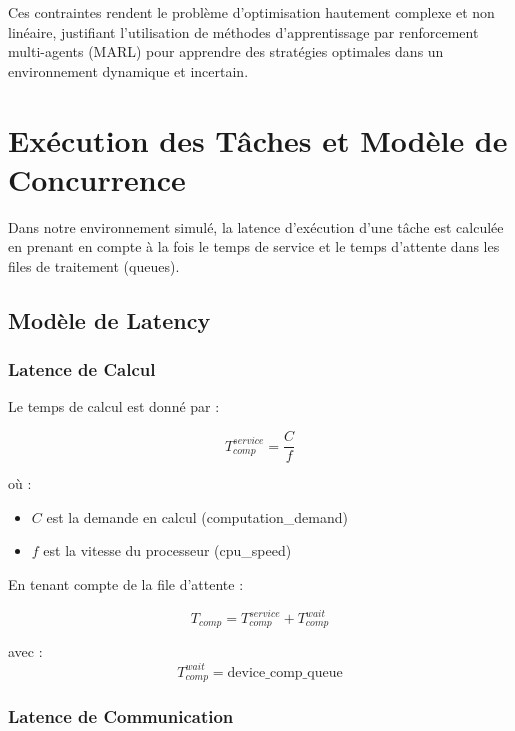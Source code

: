 \documentclass[12pt,a4paper]{article}
\begin{document}
Ces contraintes rendent le problème d'optimisation hautement complexe et non linéaire, justifiant l'utilisation de méthodes d'apprentissage par renforcement multi-agents (MARL) pour apprendre des stratégies optimales dans un environnement dynamique et incertain.

\section{Exécution des Tâches et Modèle de Concurrence}

Dans notre environnement simulé, la latence d'exécution d'une tâche est calculée en prenant en compte à la fois le temps de service et le temps d'attente dans les files de traitement (queues).

\subsection{Modèle de Latency}

\subsubsection{Latence de Calcul}

Le temps de calcul est donné par :

\begin{equation}
    T_{comp}^{service} = \frac{C}{f}
\end{equation}

où :
\begin{itemize}
    \item $C$ est la demande en calcul (computation\_demand)
    \item $f$ est la vitesse du processeur (cpu\_speed)
\end{itemize}

En tenant compte de la file d'attente :

\begin{equation}
    T_{comp} = T_{comp}^{service} + T_{comp}^{wait}
\end{equation}

avec :
\begin{equation}
    T_{comp}^{wait} = \text{device\_comp\_queue}
\end{equation}

 

\subsubsection{Latence de Communication}
\end{document}
